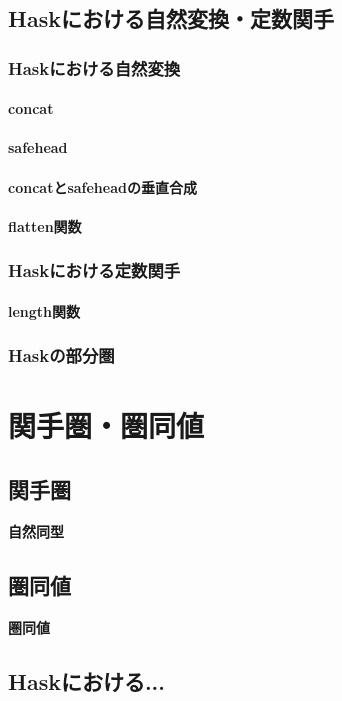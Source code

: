 \documentclass{jsbook}
\theoremstyle{plain}
\begin{document}
\section{Haskにおける自然変換・定数関手}
\subsection{Haskにおける自然変換}
\subsubsection{concat}
\subsubsection{safehead}
\subsubsection{concatとsafeheadの垂直合成}
\subsubsection{flatten関数}
\subsection{Haskにおける定数関手}
\subsubsection{length関数}
\subsection{Haskの部分圏}
\chapter{関手圏・圏同値}
\section{関手圏}
\begin{Def}
\bf{自然同型}
\end{Def}
\section{圏同値}
\begin{Def}
\bf{圏同値}
\end{Def}
\section{Haskにおける...}
\end{document}
